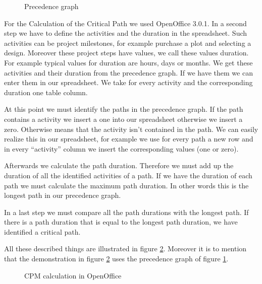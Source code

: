 \begin{figure}[h] 
\centerline{}
\caption{Precedence graph}
\label{pic:seqChart}
\end{figure}

For the Calculation of the Critical Path we used OpenOffice 3.0.1. 
In a second step we have to define the activities and the duration in the spreadsheet. Such activities can be project milestones, for example purchase a plot and selecting a design. Moreover these project steps have values, we call these values duration. For example typical values for duration are hours, days or months. We get these activities and their duration from the precedence graph. If we have them we can enter them in our spreadsheet. We take for every activity and the corresponding duration one table column.

At this point we must identify the paths in the precedence graph. If the path contains a activity we insert a one into our spreadsheet otherwise we insert a zero. Otherwise means that the activity isn't contained in the path.  We can easily realize this in our spreadsheet, for example we use for every path a new row and in every “activity” column we insert the corresponding values (one or zero). 

Afterwards we calculate the path duration. Therefore we must add up the duration of all the identified activities of a path. If we have the duration of each path we must calculate the maximum path duration. In other words this is the longest path in our precedence graph.

In a last step we must compare all the path durations with the longest path. If there is a path duration that is equal to the longest path duration, we have identified a critical path.
 
All these described things are illustrated in figure \ref{pic:office}. Moreover it is to mention that the demonstration in figure \ref{pic:office} uses the precedence graph of figure \ref{pic:seqChart}.
\begin{figure}[h] 
\centerline{}
\caption{CPM calculation in OpenOffice}
\label{pic:office}
\end{figure}


